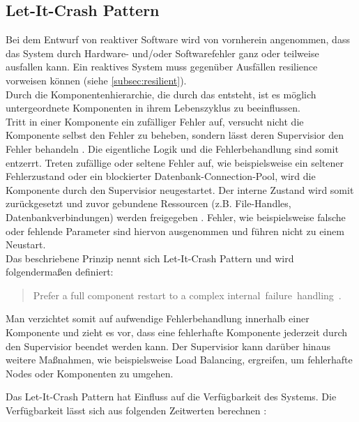 \pagebreak

\subsection{Let-It-Crash Pattern}\label{subsec:let-it-crash-pattern}
Bei dem Entwurf von reaktiver Software wird von vornherein angenommen, dass das System durch Hardware- und/oder Softwarefehler ganz oder teilweise ausfallen kann. Ein reaktives System muss gegenüber Ausfällen resilience vorweisen können (siehe \ref{subsec:resilient}).\\
Durch die Komponentenhierarchie, die durch das  entsteht, ist es möglich untergeordnete Komponenten in ihrem Lebenszyklus zu beeinflussen.\\
Tritt in einer Komponente ein zufälliger Fehler auf, versucht nicht die Komponente selbst den Fehler zu beheben, sondern lässt deren Supervisior den Fehler behandeln \cite[S.~196]{kuhn_reactive_2015} \cite[S.~200~\&~S.~201]{armstrong_programming_2013}. Die eigentliche Logik und die Fehlerbehandlung sind somit entzerrt. Treten zufällige oder seltene Fehler auf, wie beispielsweise ein seltener Fehlerzustand oder ein blockierter Datenbank-Connection-Pool, wird die Komponente durch den Supervisior neugestartet. Der interne Zustand wird somit zurückgesetzt und zuvor gebundene Ressourcen (z.B. File-Handles, Datenbankverbindungen) werden freigegeben \cite[S.~197]{kuhn_reactive_2015}. Fehler, wie beispielsweise falsche oder fehlende Parameter sind hiervon ausgenommen und führen nicht zu einem Neustart.\\
Das beschriebene Prinzip nennt sich Let-It-Crash Pattern und wird folgendermaßen definiert:

\begin{quotation}
Prefer a full component restart to a complex internal~failure~handling~\cite[S.~196]{kuhn_reactive_2015}.
\end{quotation}

Man verzichtet somit auf aufwendige Fehlerbehandlung innerhalb einer Komponente und zieht es vor, dass eine fehlerhafte Komponente jederzeit durch den Supervisior beendet werden kann. Der Supervisior kann darüber hinaus weitere Maßnahmen, wie beispielsweise Load Balancing, ergreifen, um fehlerhafte Nodes oder Komponenten zu umgehen.

\pagebreak

Das Let-It-Crash Pattern hat Einfluss auf die Verfügbarkeit des Systems. Die Verfügbarkeit lässt sich aus folgenden Zeitwerten berechnen \cite{friedrichsen_unkaputtbar_2014}:

